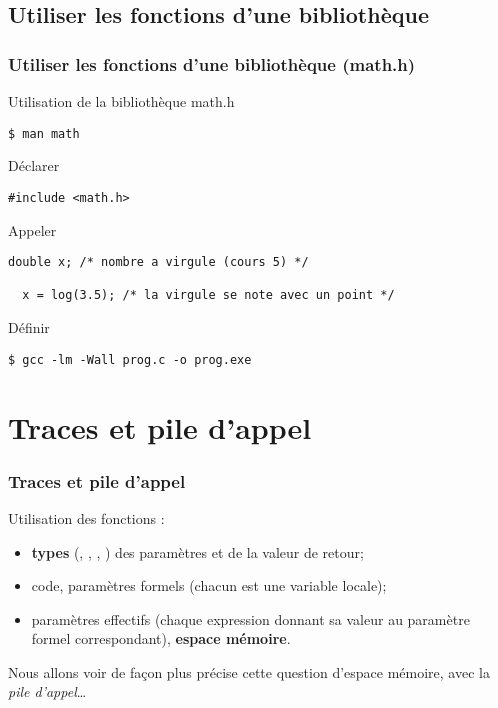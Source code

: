 \documentclass[xcolor=pdftex,svgnames,table]{beamer}
\begin{document}
\subsection[math.h]{Utiliser les fonctions d'une bibliothèque}

\begin{frame}[fragile]
  \frametitle{Utiliser les fonctions d'une bibliothèque (math.h)}
Utilisation de la bibliothèque math.h
\begin{verbatim}
$ man math
\end{verbatim}
  \begin{block}{Déclarer}
    \begin{lstlisting}[basicstyle=\ttfamily\small]
#include <math.h>
     \end{lstlisting}
  \end{block}

  \begin{block}{Appeler}
  \begin{lstlisting}[basicstyle=\ttfamily\small]
  double x; /* nombre a virgule (cours 5) */

  x = log(3.5); /* la virgule se note avec un point */
    \end{lstlisting}
  \end{block}

  \begin{block}{Définir}
\begin{verbatim}
$ gcc -lm -Wall prog.c -o prog.exe
\end{verbatim}
 \end{block}
\end{frame}

\section{Traces et pile d'appel}

\begin{frame}
  \frametitle{Traces et pile d'appel\nowrite}
 Utilisation des fonctions :
  \begin{itemize}
    \item {} \textbf{types} (, ,
      , ) des paramètres et de la valeur de retour;
    \item {}  code, paramètres formels (chacun est
      une variable locale);
    \item {} paramètres effectifs (chaque expression
      donnant sa valeur au paramètre formel correspondant), \textbf{espace mémoire}.
  \end{itemize}

Nous allons voir de façon plus précise cette question
d'espace mémoire, avec la \emph{pile d'appel}…

\end{frame}
\end{document}
